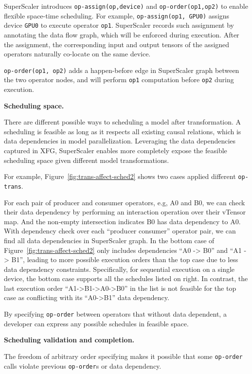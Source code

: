 {SuperScaler} introduces \texttt{op-assign(op,device)} and \texttt{op-order(op1,op2)} to enable flexible space-time scheduling. For example, \texttt{op-assign(op1, GPU0)} assigns device \texttt{GPU0} to execute operator \texttt{op1}. {SuperScaler} records such assignment by annotating the data flow graph, which will be enforced during execution. After the assignment, the corresponding input and output tensors of the assigned operators naturally co-locate on the same device.

\texttt{op-order(op1, op2)} adds a happen-before edge in {SuperScaler} graph between the two operator nodes, and will perform \texttt{op1} computation before \texttt{op2} during execution.


{\bf  Scheduling space. }

There are different possible ways to scheduling a model after transformation. A scheduling is feasible as long as it respects all existing causal relations, which is data dependencies in model parallelization. Leveraging the data dependencies captured in XFG, {SuperScaler} enables more completely expose the feasible scheduling space given different model transformations.

For example, Figure~\ref{fig:trans-affect-sched2} shows two cases applied different \texttt{op-trans}.

For each pair of producer and consumer operators, e.g, A0 and B0, we can check their data dependency by performing an interaction operation over their vTensor map. And the non-empty intersection indicates B0 has data dependency to A0. With dependency check over each ``producer consumer'' operator pair, we can find all data dependencies in {SuperScaler} graph. In the bottom case of Figure~\ref{fig:trans-affect-sched2} only includes dependencies ``A0 -> B0'' and ``A1 -> B1'', leading to more possible execution orders than the top case due to less data dependency constraints. Specifically, for sequential execution on a single device, the bottom case supports all the schedules listed on right. In contrast, the last execution order ``A1->B1->A0->B0'' in the list is not feasible for the top case as conflicting with its ``A0->B1'' data dependency.

By specifying \texttt{op-order} between operators that without data dependent, a developer can express any possible schedules in feasible space.
\fi

{\bf  Scheduling validation and completion. }

The freedom of arbitrary order specifying makes it possible  that some \texttt{op-order} calls violate previous \texttt{op-order}s or data dependency.

